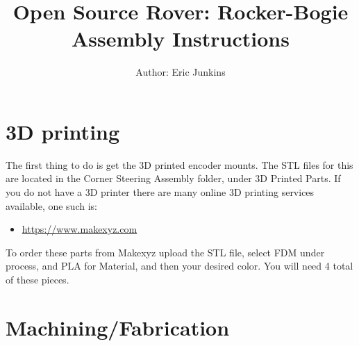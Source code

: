 \documentclass[12pt]{article}
\begin{document}
\title{Open Source Rover: Rocker-Bogie Assembly Instructions}
\author{Author: Eric Junkins}

\makeatletter         
\def\@maketitle{
\begin{center}	
	\makebox[\textwidth][c]{ \texttt{[image: "Pictures/Corner Title".png]}}
	{\Huge \bfseries \sffamily \@title }\\[3ex] 
	{\Large \sffamily \@author}\\[3ex] 
	\texttt{[image: "Pictures/JPL logo".png]}
\end{center}}
\makeatother

\maketitle




\newpage

\tableofcontents


\section{3D printing}
The first thing to do is get the 3D printed encoder mounts. The STL files for this are located in the Corner Steering Assembly folder, under 3D Printed Parts. If you do not have a 3D printer there are many online 3D printing services available, one such is:

\begin{itemize}
	\item \href{https://www.makexyz.com}{https://www.makexyz.com}
\end{itemize}

To order these parts from Makexyz upload the STL file, select FDM under process, and PLA for Material, and then your desired color. You will need 4 total of these pieces. 

\section{Machining/Fabrication}
\end{document}

